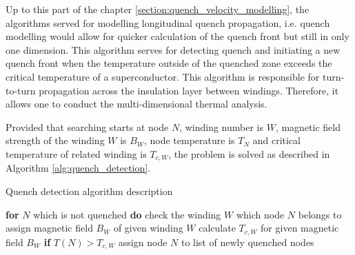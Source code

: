 
Up to this part of the chapter \ref{section:quench_velocity_modelling}, the algorithms served for modelling longitudinal quench propagation, i.e. quench modelling would allow for quicker calculation of the quench front but still in only one dimension. This algorithm serves for detecting quench and initiating a new quench front when the temperature outside of the quenched zone exceeds the critical temperature of a superconductor. This algorithm is responsible for turn-to-turn propagation across the insulation layer between windings. Therefore, it allows one to conduct the multi-dimensional thermal analysis. 

Provided that searching starts at node $N$, winding number is $W$, magnetic field strength of the winding $W$ is $B_W$, node temperature is $T_N$ and critical temperature of related winding is $T_{c,W}$, the problem is solved as described in Algorithm \ref{alg:quench_detection}.

\begin{algorithm}
    \caption{Quench detection algorithm description}
    \label{alg:quench_detection}
    \begin{algorithmic}[1]
    \STATE \textbf{for} $N$ which is not quenched \textbf{do}
    \STATE \hspace{0.5cm} check the winding $W$ which node $N$ belongs to
    \STATE \hspace{0.5cm} assign magnetic field $B_W$ of given winding $W$
    \STATE \hspace{0.5cm} calculate $T_{c,W}$ for given magnetic field $B_W$
    \STATE \hspace{0.5cm} \textbf{if} $T(N) > T_{c,W}$
    \STATE \hspace{1.0cm} assign node $N$ to list of newly quenched nodes
    \end{algorithmic}
\end{algorithm}